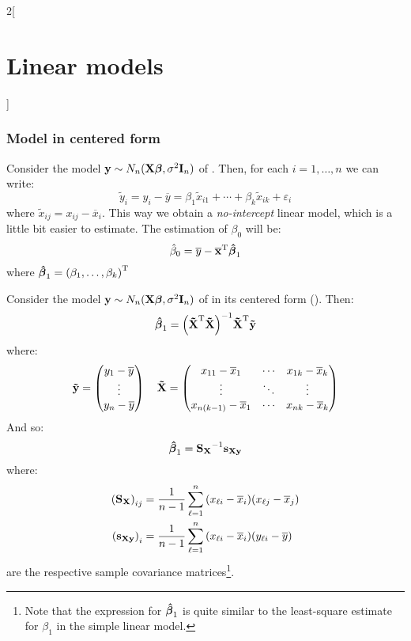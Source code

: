 \documentclass[../../../main_math.tex]{subfiles}
\begin{document}
\begin{multicols}{2}[\section{Linear models}]
  \subsubsection{Model in centered form}
  \begin{definition}
    Consider the model $\boldsymbol{\mathrm{y}}\sim N_n(\boldsymbol{\mathrm{X\beta}},\sigma^2\boldsymbol{\mathrm{I}}_n)$ of . Then, for each $i=1,\ldots,n$ we can write:
    \begin{equation}\label{LM:centered}
      \tilde{y}_i=y_i-\overline{y}=\beta_1\tilde{x}_{i1}+\cdots+\beta_k\tilde{x}_{ik}+\varepsilon_i
    \end{equation}
    where $\tilde{x}_{ij}=x_{ij}-\overline{x}_i$. This way we obtain a \emph{no-intercept} linear model, which is a little bit easier to estimate. The estimation of $\beta_0$ will be: $$\hat{\beta}_0=\overline{y}-{\boldsymbol{\mathrm{\overline{x}}}}^{\mathrm{T}}\boldsymbol{\mathrm{\hat\beta}}_{1}$$ where $\boldsymbol{\mathrm{\hat{\beta}}}_1={(\beta_1,\ldots,\beta_k)}^{\mathrm{T}}$
  \end{definition}
  \begin{proposition}
    Consider the model $\boldsymbol{\mathrm{y}}\sim N_n(\boldsymbol{\mathrm{X\beta}},\sigma^2\boldsymbol{\mathrm{I}}_n)$ of  in its centered form (). Then: $$\boldsymbol{\mathrm{\hat\beta}}_{1}={\left({\boldsymbol{\mathrm{\tilde{X}}}}^{\mathrm{T}}\boldsymbol{\mathrm{\tilde{X}}}\right)}^{-1}{\boldsymbol{\mathrm{\tilde{X}}}}^{\mathrm{T}}\boldsymbol{\mathrm{\tilde{y}}}$$
    where: $$\boldsymbol{\mathrm{\tilde{y}}}=\begin{pmatrix}
        y_1  -\overline{y} \\
        \vdots             \\
        y_n -\overline{y}
      \end{pmatrix}\quad\boldsymbol{\mathrm{\tilde{X}}}=
      \begin{pmatrix}
        x_{11}-\overline{x}_1      & \cdots & x_{1k}-\overline{x}_k \\
        \vdots                     & \ddots & \vdots                \\
        x_{n(k-1)} -\overline{x}_1 & \cdots & x_{nk}-\overline{x}_k
      \end{pmatrix}$$
    And so: $$\boldsymbol{\mathrm{\hat\beta}}_{1}={\boldsymbol{\mathrm{S}}_{\boldsymbol{\mathrm{X}}}}^{-1}{\boldsymbol{\mathrm{s}}_{\boldsymbol{\mathrm{Xy}}}}$$ where:
    \begin{align*}
      {(\boldsymbol{\mathrm{S}}_{\boldsymbol{\mathrm{X}}})}_{ij} & =\frac{1}{n-1}\sum_{\ell=1}^n{(x_{\ell i}-\overline{x}_i)(x_{\ell j}-\overline{x}_j)} \\
      {(\boldsymbol{\mathrm{s}}_{\boldsymbol{\mathrm{Xy}}})}_i   & =\frac{1}{n-1}\sum_{\ell=1}^n{(x_{\ell i}-\overline{x}_i)(y_{\ell i}-\overline{y})}
    \end{align*}
    are the respective sample covariance matrices\footnote{Note that the expression for $\boldsymbol{\mathrm{\hat\beta}}_{1}$ is quite similar to the least-square estimate for $\beta_1$ in the simple linear model.}.
  \end{proposition}

\end{multicols}
\end{document}
